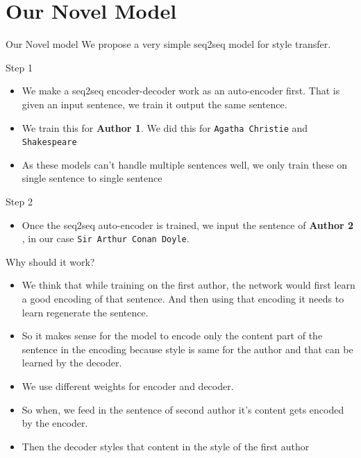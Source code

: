 \documentclass{beamer}
\begin{document}
\section{Our Novel Model}
\begin{frame}{Our Novel model}
We propose a very simple seq2seq model for style transfer.
\begin{block}{Step 1}
\begin{itemize}
    \item We make a seq2seq encoder-decoder work as an auto-encoder first. That is given an input sentence, we train it output the same sentence.
    \item We train this for \textbf{Author 1}. We did this for \texttt{Agatha Christie} and \texttt{Shakespeare}
    \item As these models can't handle multiple sentences well, we only train these on single sentence to single sentence
\end{itemize}
\end{block}
\begin{block}{Step 2}
\begin{itemize}
    \item Once the seq2seq auto-encoder is trained, we input the sentence of \textbf{Author 2} , in our case \texttt{Sir Arthur Conan Doyle}.
\end{itemize}
\end{block}
\end{frame}
\begin{frame}{Why should it work?}
\begin{itemize}
    \item We think that while training on the first author, the network would first learn a good encoding of that sentence. And then using that encoding it needs to learn regenerate the sentence.
    \item So it makes sense for the model to encode only the content part of the sentence in the encoding because style is same for the author and that can be learned by the decoder.
    \item We use different weights for encoder and decoder.
    \item So when, we feed in the sentence of second author it's content gets encoded by the encoder.
    \item Then the decoder styles that content in the style of the first author
\end{itemize}
\end{frame}
\end{document}
